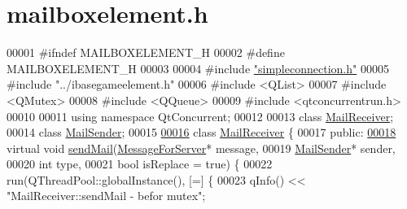 \hypertarget{a00002_source}{}\section{mailboxelement.\+h}
\label{a00002_source}

\begin{DoxyCode}
00001 \textcolor{preprocessor}{#}\textcolor{preprocessor}{ifndef} \textcolor{preprocessor}{MAILBOXELEMENT\_H}
00002 \textcolor{preprocessor}{#}\textcolor{preprocessor}{define} \textcolor{preprocessor}{MAILBOXELEMENT\_H}
00003 
00004 \textcolor{preprocessor}{#}\textcolor{preprocessor}{include} \hyperlink{a00008}{"simpleconnection.h"}
00005 \textcolor{preprocessor}{#}\textcolor{preprocessor}{include} \textcolor{preprocessor}{"../ibasegameelement.h"}
00006 \textcolor{preprocessor}{#}\textcolor{preprocessor}{include} \textcolor{preprocessor}{<}\textcolor{preprocessor}{QList}\textcolor{preprocessor}{>}
00007 \textcolor{preprocessor}{#}\textcolor{preprocessor}{include} \textcolor{preprocessor}{<}\textcolor{preprocessor}{QMutex}\textcolor{preprocessor}{>}
00008 \textcolor{preprocessor}{#}\textcolor{preprocessor}{include} \textcolor{preprocessor}{<}\textcolor{preprocessor}{QQueue}\textcolor{preprocessor}{>}
00009 \textcolor{preprocessor}{#}\textcolor{preprocessor}{include} \textcolor{preprocessor}{<}\textcolor{preprocessor}{qtconcurrentrun}\textcolor{preprocessor}{.}\textcolor{preprocessor}{h}\textcolor{preprocessor}{>}
00010 
00011 \textcolor{keyword}{using} \textcolor{keyword}{namespace} QtConcurrent;
00012 
00013 \textcolor{keyword}{class} \hyperlink{a00197_ace6950e3788bb037f23ce8668ef83829}{MailReceiver};
00014 \textcolor{keyword}{class} \hyperlink{a00205}{MailSender};
00015 
\hyperlink{a00197}{00016} \textcolor{keyword}{class} \hyperlink{a00197_ace6950e3788bb037f23ce8668ef83829}{MailReceiver} \{
00017  \textcolor{keyword}{public}:
\hyperlink{a00197_a0efada2a49e9a841430a8b6f71b6803d}{00018}   \textcolor{keyword}{virtual} \textcolor{keywordtype}{void} \hyperlink{a00197_a0efada2a49e9a841430a8b6f71b6803d}{sendMail}(\hyperlink{a00121_a32f7c4034883ac363ca247c8a2843040}{MessageForServer}* message,
00019                         \hyperlink{a00205}{MailSender}* sender,
00020                         \textcolor{keywordtype}{int} type,
00021                         \textcolor{keywordtype}{bool} isReplace = \textcolor{keyword}{true}) \{
00022     run(QThreadPool::globalInstance(), [=] \{
00023       qInfo() << \textcolor{stringliteral}{"MailReceiver::sendMail - befor mutex"};

\end{DoxyCode}
